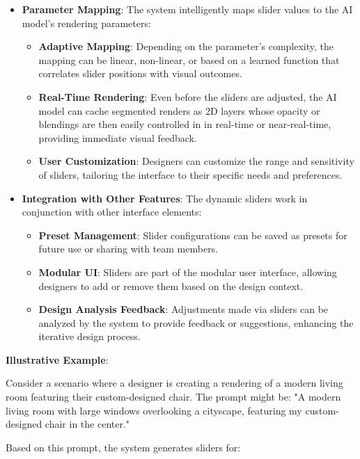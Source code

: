 \documentclass[12pt]{report}
\begin{document}
\begin{itemize}
    \item \textbf{Parameter Mapping}: The system intelligently maps slider values to the AI model's rendering parameters:

    \begin{itemize}
        \item \textbf{Adaptive Mapping}: Depending on the parameter's complexity, the mapping can be linear, non-linear, or based on a learned function that correlates slider positions with visual outcomes.
        \item \textbf{Real-Time Rendering}: Even before the sliders are adjusted, the AI model can cache segmented renders as 2D layers whose opacity or blendings are then easily controlled in in real-time or near-real-time, providing immediate visual feedback.
        \item \textbf{User Customization}: Designers can customize the range and sensitivity of sliders, tailoring the interface to their specific needs and preferences.
    \end{itemize}

    \item \textbf{Integration with Other Features}: The dynamic sliders work in conjunction with other interface elements:

    \begin{itemize}
        \item \textbf{Preset Management}: Slider configurations can be saved as presets for future use or sharing with team members.
        \item \textbf{Modular UI}: Sliders are part of the modular user interface, allowing designers to add or remove them based on the design context.
        \item \textbf{Design Analysis Feedback}: Adjustments made via sliders can be analyzed by the system to provide feedback or suggestions, enhancing the iterative design process.
    \end{itemize}
\end{itemize}

\textbf{Illustrative Example}:

Consider a scenario where a designer is creating a rendering of a modern living room featuring their custom-designed chair. The prompt might be: "A modern living room with large windows overlooking a cityscape, featuring my custom-designed chair in the center."

Based on this prompt, the system generates sliders for:
\end{document}
